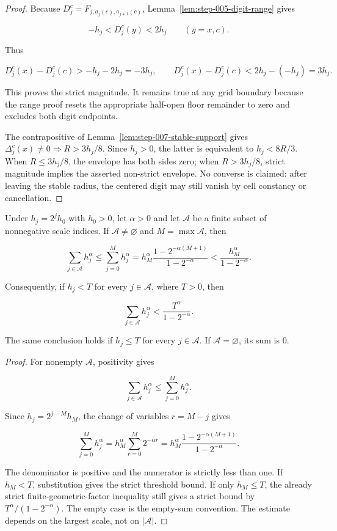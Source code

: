 \begin{proof}
Because \(D_j^c=F_{j,a_j(c),a_{j+1}(c)}\), Lemma~\ref{lem:step-005-digit-range} gives

\[
-h_j<D_j^c(y)<2h_j
\qquad (y=x,c).
\]

Thus

\[
D_j^c(x)-D_j^c(c)>-h_j-2h_j=-3h_j,
\qquad
D_j^c(x)-D_j^c(c)<2h_j-(-h_j)=3h_j.
\]

This proves the strict magnitude. It remains true at any grid boundary because the range proof resets the appropriate half-open floor remainder to zero and excludes both digit endpoints.

The contrapositive of Lemma~\ref{lem:step-007-stable-support} gives \(\Delta_j^c(x)\neq0\Rightarrow R>3h_j/8\). Since \(h_j>0\), the latter is equivalent to \(h_j<8R/3\). When \(R\leq3h_j/8\), the envelope has both sides zero; when \(R>3h_j/8\), strict magnitude implies the asserted non-strict envelope. No converse is claimed: after leaving the stable radius, the centered digit may still vanish by cell constancy or cancellation.
\end{proof}

\begin{lemma}\label{lem:step-007-dyadic-cutoff}
Under \(h_j=2^jh_0\) with \(h_0>0\), let \(\alpha>0\) and let \(\mathcal A\) be a finite subset of nonnegative scale indices. If \(\mathcal A\neq\varnothing\) and \(M=\max\mathcal A\), then

\[
\sum_{j\in\mathcal A}h_j^\alpha
\leq\sum_{j=0}^{M}h_j^\alpha
=h_M^\alpha
  \frac{1-2^{-\alpha(M+1)}}{1-2^{-\alpha}}
<\frac{h_M^\alpha}{1-2^{-\alpha}}.
\]

Consequently, if \(h_j<T\) for every \(j\in\mathcal A\), where \(T>0\), then

\[
\sum_{j\in\mathcal A}h_j^\alpha
<\frac{T^\alpha}{1-2^{-\alpha}}.
\]

The same conclusion holds if \(h_j\leq T\) for every \(j\in\mathcal A\). If \(\mathcal A=\varnothing\), its sum is \(0\).
\end{lemma}

\begin{proof}
For nonempty \(\mathcal A\), positivity gives

\[
\sum_{j\in\mathcal A}h_j^\alpha
\leq\sum_{j=0}^{M}h_j^\alpha.
\]

Since \(h_j=2^{j-M}h_M\), the change of variables \(r=M-j\) gives

\[
\sum_{j=0}^{M}h_j^\alpha
=h_M^\alpha\sum_{r=0}^{M}2^{-\alpha r}
=h_M^\alpha
  \frac{1-2^{-\alpha(M+1)}}{1-2^{-\alpha}}.
\]

The denominator is positive and the numerator is strictly less than one. If \(h_M<T\), substitution gives the strict threshold bound. If only \(h_M\leq T\), the already strict finite-geometric-factor inequality still gives a strict bound by \(T^\alpha/(1-2^{-\alpha})\). The empty case is the empty-sum convention. The estimate depends on the largest scale, not on \(|\mathcal A|\).
\end{proof}

